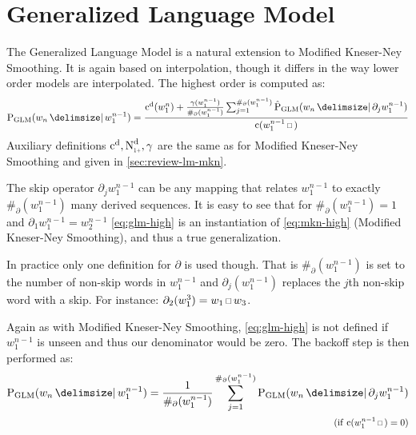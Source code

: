 \section{Generalized Language Model}
\label{sec:review-lm-glm}

The Generalized Language Model is a natural extension to Modified Kneser-Ney
Smoothing.
It is again based on interpolation, though it differs in the way lower order
models are interpolated.
The highest order is computed as:
\begin{equation}
  \label{eq:glm-high}
  \ProbGLM{w_n}{w_1^{n-1}} =
    \frac{\DiscountedCount(w_1^n) + \frac{\gamma(w_1^{n-1})}{\#_\partial(w_1^{n-1})}
                                    \sum_{j=1}^{\#_\partial(w_1^{n-1})} \ProbGLM*{w_n}{\partial_j w_1^{n-1}}}
         {\Count(w_1^{n-1} \Skp)}
\end{equation}
Auxiliary definitions $\DiscountedCount, \DiscountedCount*, \gamma$ are the same
as for Modified Kneser-Ney Smoothing and given in \cref{sec:review-lm-mkn}.

The skip operator $\partial_j w_1^{n-1}$ can be any mapping that relates
$w_1^{n-1}$ to exactly $\#_\partial(w_1^{n-1})$ many derived sequences.
It is easy to see that for $\#_\partial(w_1^{n-1}) = 1$ and
$\partial_1 w_1^{n-1} = w_2^{n-1}$ \cref{eq:glm-high} is an
instantiation of \cref{eq:mkn-high} (Modified Kneser-Ney Smoothing), and thus
a true generalization.

In practice only one definition for $\partial$ is used though.
That is $\#_\partial(w_1^{n-1})$ is set to the number of non-skip words in
$w_1^{n-1}$ and $\partial_j(w_1^{n-1})$ replaces the $j$th non-skip word with
a skip.
For instance: $\partial_2(w_1^3) = w_1 \Skp w_3$.

Again as with Modified Kneser-Ney Smoothing, \cref{eq:glm-high} is not
defined if $w_1^{n-1}$ is unseen and thus our denominator would be zero.
The backoff step is then performed as:
\begin{equation}
  \label{eq:glm-backoff}
  \begin{split}
    \ProbGLM{w_n}{w_1^{n-1}} = \frac{1}{\#_\partial(w_1^{n-1})}
                               \sum_{j=1}^{\#_\partial(w_1^{n-1})} \ProbGLM{w_n}{\partial_j w_1^{n-1}} \\
      \hfill \Condition{\Count(w_1^{n-1} \Skp) = 0}
  \end{split}
\end{equation}

